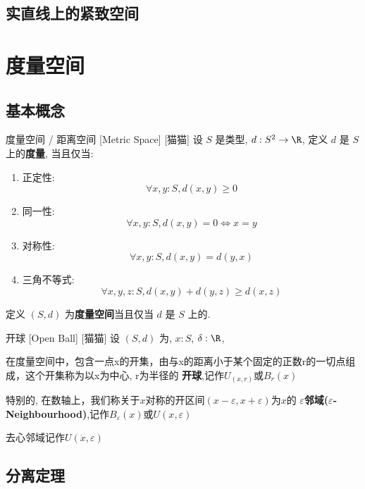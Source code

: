 \documentclass[UTF8]{ctexart}
\begin{document}
        \subsection{实直线上的紧致空间}
            
                

    \section{度量空间}
        
        \subsection{基本概念}
            
            \begin{dfn}
                {度量空间 / 距离空间}
                [Metric Space]
                [猫猫]
                设 \(S\) 是类型, \(d:S^2\to\R\), 定义 \(d\) 是 \(S\) 上的\textbf{度量}, 当且仅当: 
                \begin{enumerate}
                    \item 正定性: 
                    \[\forall x,y:S, d(x,y)\geq 0\]

                    \item 同一性: 
                    \[\forall x,y:S, d(x,y)=0\iff x=y\]
    
                    \item 对称性: 
                    \[\forall x,y:S, d(x,y)=d(y,x)\]
    
                    \item 三角不等式: 
                    \[\forall x,y,z:S, d(x,y)+d(y,z)\geq d(x,z)\]
                \end{enumerate}

                定义 \((S,d)\) 为\textbf{度量空间}当且仅当 \(d\) 是 \(S\) 上的. 
            \end{dfn}

            \begin{dfn}
                [OpenBall]
				{开球}
                [Open Ball]
                [猫猫]
                设 \((S,d)\) 为, \(x:S\), \(\delta:\R\), 

				在度量空间中，包含一点x的开集，由与x的距离小于某个固定的正数r的一切点组成，这个开集称为以x为中心, r为半径的 \textbf{开球},记作\(U_(x,r)\)或\(B_{r}(x)\)

				特别的, 在数轴上，我们称关于\(x\)对称的开区间\((x-\varepsilon,x+\varepsilon)\)为\(x\)的 \textbf{\(\varepsilon\)邻域(\(\varepsilon\)-Neighbourhood)},记作\(B_{\varepsilon}(x)\)或\(U(x,\varepsilon)\)

				去心邻域记作\(U(\dot{x},\varepsilon)\)
		\end{dfn}

        \subsection{分离定理}
            
\end{document}
